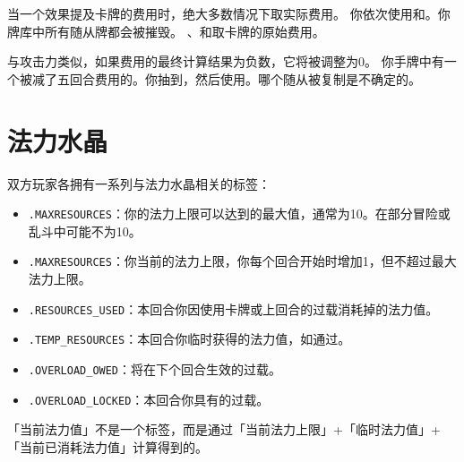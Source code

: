 当一个效果提及卡牌的费用时，绝大多数情况下取实际费用。
\example 你依次使用和。你牌库中所有随从牌都会被摧毁。
\exception {}、和取卡牌的原始费用。

与攻击力类似，如果费用的最终计算结果为负数，它将被调整为0。
\example 你手牌中有一个被减了五回合费用的。你抽到，然后使用。哪个随从被复制是不确定的。

\section{法力水晶}
双方玩家各拥有一系列与法力水晶相关的标签：
\begin{itemize}
    \item {}\texttt{.MAXRESOURCES}：你的法力上限可以达到的最大值，通常为10。在部分冒险或乱斗中可能不为10。
    \item {}\texttt{.MAXRESOURCES}：你当前的法力上限，你每个回合开始时增加1，但不超过最大法力上限。
    \item {}\texttt{.RESOURCES\_USED}：本回合你因使用卡牌或上回合的过载消耗掉的法力值。
    \item {}\texttt{.TEMP\_RESOURCES}：本回合你临时获得的法力值，如通过。
    \item {}\texttt{.OVERLOAD\_OWED}：将在下个回合生效的过载。
    \item {}\texttt{.OVERLOAD\_LOCKED}：本回合你具有的过载。
\end{itemize}
\notice 「当前法力值」不是一个标签，而是通过「当前法力上限」+「临时法力值」+「当前已消耗法力值」计算得到的。

